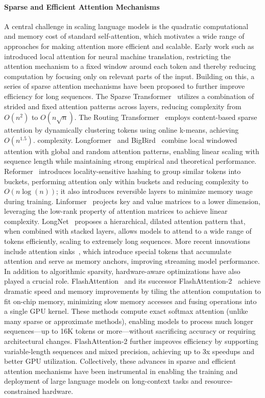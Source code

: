 \paragraph{Sparse and Efficient Attention Mechanisms}
A central challenge in scaling language models is the quadratic computational and memory cost of standard self-attention, which motivates a wide range of approaches for making attention more efficient and scalable. Early work such as \citet{luong2015effective} introduced local attention for neural machine translation, restricting the attention mechanism to a fixed window around each token and thereby reducing computation by focusing only on relevant parts of the input. Building on this, a series of sparse attention mechanisms have been proposed to further improve efficiency for long sequences. The Sparse Transformer~\citep{child2019generating} utilizes a combination of strided and fixed attention patterns across layers, reducing complexity from $O(n^2)$ to $O(n\sqrt{n})$. The Routing Transformer~\citep{roy2020efficient} employs content-based sparse attention by dynamically clustering tokens using online k-means, achieving $O(n^{1.5})$. complexity. Longformer~\citep{beltagy2020longformer} and BigBird~\citep{zaheer2020big} combine local windowed attention with global and random attention patterns, enabling linear scaling with sequence length while maintaining strong empirical and theoretical performance. Reformer~\citep{kitaev2020reformer} introduces locality-sensitive hashing to group similar tokens into buckets, performing attention only within buckets and reducing complexity to $O(n\log(n))$; it also introduces reversible layers to minimize memory usage during training. Linformer~\citep{wang2020linformer} projects key and value matrices to a lower dimension, leveraging the low-rank property of attention matrices to achieve linear complexity. LongNet~\citep{ding2023longnet} proposes a hierarchical, dilated attention pattern that, when combined with stacked layers, allows models to attend to a wide range of tokens efficiently, scaling to extremely long sequences. More recent innovations include attention sinks~\citep{xiao2023attentionsink}, which introduce special tokens that accumulate attention and serve as memory anchors, improving streaming model performance.
In addition to algorithmic sparsity, hardware-aware optimizations have also played a crucial role. FlashAttention~\citep{dao2022flashattention} and its successor FlashAttention-2~\citep{dao2023flashattention2} achieve dramatic speed and memory improvements by tiling the attention computation to fit on-chip memory, minimizing slow memory accesses and fusing operations into a single GPU kernel. These methods compute exact softmax attention (unlike many sparse or approximate methods), enabling models to process much longer sequences—up to 16K tokens or more—without sacrificing accuracy or requiring architectural changes. FlashAttention-2 further improves efficiency by supporting variable-length sequences and mixed precision, achieving up to 3x speedups and better GPU utilization. Collectively, these advances in sparse and efficient attention mechanisms have been instrumental in enabling the training and deployment of large language models on long-context tasks and resource-constrained hardware.

